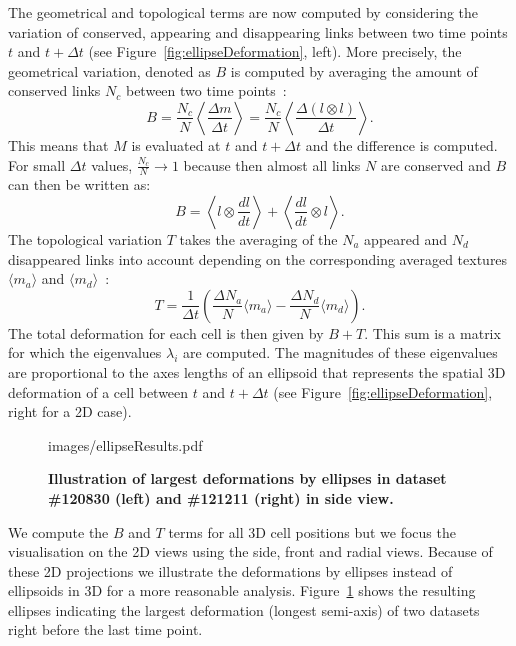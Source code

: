 \documentclass[11pt,a4paper, final]{article}
\begin{document}
\noindent
The geometrical and topological terms are now computed by considering the variation of conserved, appearing and disappearing links between two time points $t$ and $t + \Delta t$ (see Figure~\ref{fig:ellipseDeformation}, left). More precisely, the geometrical variation, denoted as $B$ is computed by averaging the amount of conserved links $N_c$ between two time points~\cite{graner_et_al_2008}:
\begin{equation}
B = \frac{N_c}{N} \left\langle \frac{\Delta m}{\Delta t} \right\rangle = \frac{N_c}{N} \left\langle \frac{\Delta (l \otimes l) }{\Delta t} \right\rangle.
\end{equation}
This means that $M$ is evaluated at $t$ and $t + \Delta t$ and the difference is computed. For small $\Delta t$ values, $\frac{N_c}{N} \rightarrow 1$ because then almost all links $N$ are conserved and $B$ can then be written as:
\begin{equation}
B = \left\langle l \otimes \frac{dl}{dt} \right\rangle + \left\langle \frac{dl}{dt} \otimes l \right\rangle.
\end{equation}
The topological variation $T$ takes the averaging of the $N_a$ appeared and $N_d$ disappeared links into account depending on the corresponding averaged textures $\langle m_a \rangle$ and $\langle m_d \rangle$~\cite{graner_et_al_2008}:
\begin{equation}
T = \frac{1}{\Delta t} \left( \frac{\Delta N_a}{N} \langle m_a \rangle - \frac{\Delta N_d}{N} \langle m_d \rangle \right).
\end{equation}
The total deformation for each cell is then given by $B+T$. This sum is a matrix for which the eigenvalues $\lambda_i$ are computed. The magnitudes of these eigenvalues are proportional to the axes lengths of an ellipsoid that represents the spatial 3D deformation of a cell between $t$ and $t + \Delta t$ (see Figure~\ref{fig:ellipseDeformation}, right for a 2D case).
%
\begin{figure}[htbp]
	\begin{center}
		\begin{overpic}[width=1.\linewidth]{images/ellipseResults.pdf}
		\end{overpic}
\caption[]
{
{\bf Illustration of largest deformations by ellipses in dataset \#120830 (left) and \#121211 (right) in side view.}
}
	\label{fig:ellipseResults}
	\end{center}
\end{figure}
%
We compute the $B$ and $T$ terms for all 3D cell positions but we focus the visualisation on the 2D views using the side, front and radial views. Because of these 2D projections we illustrate the deformations by ellipses instead of ellipsoids in 3D for a more reasonable analysis. Figure~\ref{fig:ellipseResults} shows the resulting ellipses indicating the largest deformation (longest semi-axis) of two datasets right before the last time point.
\end{document}
